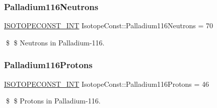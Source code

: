 \subsubsection{\texorpdfstring{Palladium116\+Neutrons}{Palladium116Neutrons}}
{\footnotesize\ttfamily \mbox{\hyperlink{group___isotope_const-_macros_ga5f18360b3e99483a35c32d789e62621c}{I\+S\+O\+T\+O\+P\+E\+C\+O\+N\+S\+T\+\_\+\+I\+NT}} Isotope\+Const\+::\+Palladium116\+Neutrons = 70}

\$ \$ Neutrons in Palladium-\/116. \mbox{\label{group___isotope_const-_palladium-_pd116_ga20d58ef92226ae6c66898b9cda7f07da}} 
\subsubsection{\texorpdfstring{Palladium116\+Protons}{Palladium116Protons}}
{\footnotesize\ttfamily \mbox{\hyperlink{group___isotope_const-_macros_ga5f18360b3e99483a35c32d789e62621c}{I\+S\+O\+T\+O\+P\+E\+C\+O\+N\+S\+T\+\_\+\+I\+NT}} Isotope\+Const\+::\+Palladium116\+Protons = 46}

\$ \$ Protons in Palladium-\/116. 